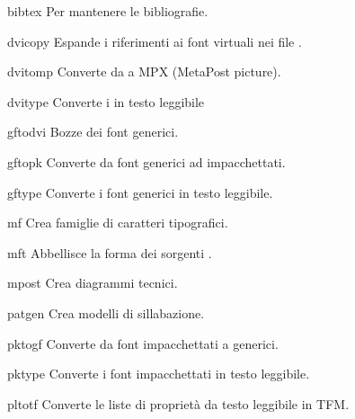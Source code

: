 \documentclass{article}
\begin{document}
\begin{cmddescription}
\item[bibtex]    Per mantenere le bibliografie.
\item[dvicopy]   Espande i riferimenti ai font virtuali nei file \dvi{}.
\item[dvitomp]   Converte da \dvi{} a MPX (MetaPost picture).
\item[dvitype]   Converte i \dvi{} in testo leggibile
\item[gftodvi]   Bozze dei font generici.
\item[gftopk]    Converte da font generici ad impacchettati.
\item[gftype]    Converte i font generici in testo leggibile.
\item[mf]        Crea famiglie di caratteri tipografici.
\item[mft]       Abbellisce la forma dei sorgenti \MF{}.
\item[mpost]     Crea diagrammi tecnici.
\item[patgen]    Crea modelli di sillabazione.
\item[pktogf]    Converte da font impacchettati a generici.
\item[pktype]    Converte i font impacchettati in testo leggibile.
\item[pltotf]    Converte le liste di proprietà da testo leggibile in TFM.

\end{cmddescription}
\end{document}
